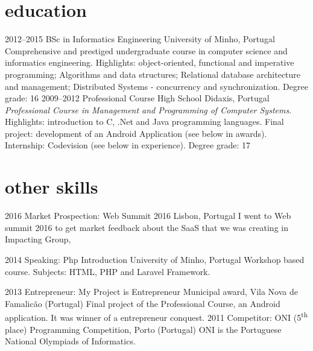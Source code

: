 \documentclass[]{friggeri-cv} %
\begin{document}
\section{education}

\begin{entrylist}
\entry
{2012--2015}
{BSc in Informatics Engineering }
{University of Minho, Portugal}
{Comprehensive and prestiged undergraduate course in computer science and informatics engineering. Highlights: object-oriented, functional and imperative programming; Algorithms and data structures; Relational database architecture and management; Distributed Systems - concurrency and synchronization. Degree grade: 16 }
\entry
{2009--2012}
{Professional Course {\normalfont High School}}
{Didaxis, Portugal}
{\emph{Professional Course in Management and Programming of Computer Systems}. Highlights: introduction to C, .Net and Java programming languages. Final project: development of an Android Application (see below in awards). Internship: Codevision (see below in experience). Degree grade: 17}

\end{entrylist}


\newpage
\section{other skills}
\begin{entrylist}
\entry
{2016}
{Market Prospection: Web Summit 2016}
{Lisbon, Portugal}
{I went to Web summit 2016 to get market feedback about the SaaS that we was creating in Impacting Group,}

\entry
{2014}
{Speaking: Php Introduction}
{University of Minho, Portugal}
{Workshop based course. Subjects: HTML, PHP and Laravel Framework.}

\entry
{2013}
{Entrepreneur: My Project is Entrepreneur}
{Municipal award, Vila Nova de Famalicão (Portugal)}
{Final project of the Professional Course, an Android application. It was winner of a entrepreneur conquest. }
\entry
{2011}
{Competitor: ONI (5\textsuperscript{th} place)}
{Programming Competition, Porto (Portugal)}
{ONI is the Portuguese National Olympiads of Informatics.}

\end{entrylist}
\end{document}
